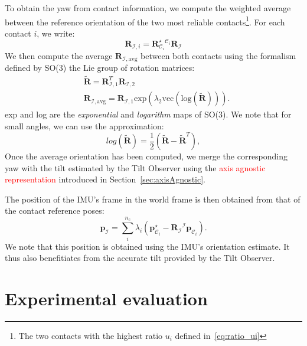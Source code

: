 \documentclass{IJCAS}
\begin{document}
To obtain the yaw from contact information, we compute the weighted average between the reference orientation of the two most reliable contacts\footnote{The two contacts with the highest ratio $u_{i}$ defined in~\eqref{eq:ratio_ui}}. For each contact $i$, we write:
\begin{equation}
    \boldsymbol{R}_{\mathcal{I}, i} = \boldsymbol{R}^{\star}_{\mathcal{C}_{i}} {}^{\mathcal{C}_{i}} \boldsymbol{R}_{\mathcal{I}} 
\end{equation}
We then compute the average $\boldsymbol{R}_{\mathcal{I}, \text{avg}}$ between both contacts using the formalism defined by SO(3) the Lie group of rotation matrices:
\begin{align}
    &\tilde{\boldsymbol{R}} = \boldsymbol{R}^{T}_{\mathcal{I}, 1} \boldsymbol{R}_{\mathcal{I}, 2}  \\
 & \boldsymbol{R}_{\mathcal{I}, \text{avg}} = \boldsymbol{R}_{\mathcal{I}, 1} \text{exp} \left( \lambda_{2} \text{vec}\left(\text{log} \left( \tilde{\boldsymbol{R}}\right)\right)  \right).
\end{align}
exp and log are the \emph{exponential} and \emph{logarithm} maps of SO(3). We note that for small angles, we can use the approximation:
\begin{equation}
log\left(\tilde{\boldsymbol{R}}\right) = \frac{1}{2} \left(\tilde{\boldsymbol{R}}-\tilde{\boldsymbol{R}}^{T}\right), \label{eq:log_small}
\end{equation}
Once the average orientation has been computed, we merge the corresponding yaw with the tilt estimated by the Tilt Observer using the \textcolor{red}{axis agnostic representation} introduced in Section~\ref{sec:axisAgnostic}.

The position of the IMU's frame in the world frame is then obtained from that of the contact reference poses: 
\begin{equation}
    \boldsymbol{p}_{\mathcal{I}} = \sum^{n_{c}}_{i} \lambda_{i} \left( \boldsymbol{p}^{\star}_{{\mathcal{C}}_{i}} - \boldsymbol{R}_{\mathcal{I}} {}^{\mathcal{I}}\boldsymbol{p}_{{\mathcal{C}}_{i}} \right).
\end{equation}
We note that this position is obtained using the IMU's orientation estimate. It thus also benefitiates from the accurate tilt provided by the Tilt Observer.


\section{Experimental evaluation}
\end{document}
